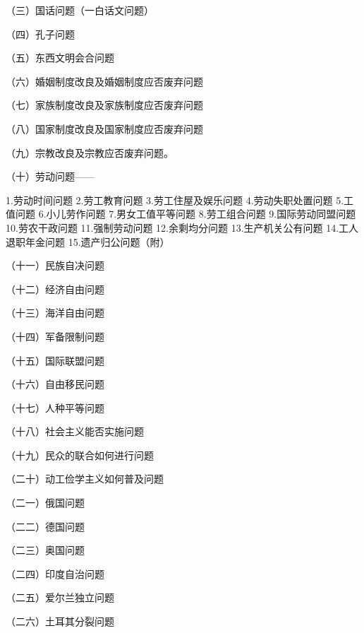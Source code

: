 （三）国话问题（一白话文问题）

（四）孔子问题

（五）东西文明会合问题

（六）婚姻制度改良及婚姻制度应否废弃问题

（七）家族制度改良及家族制度应否废弃问题

（八）国家制度改良及国家制度应否废弃问题

（九）宗教改良及宗教应否废弃问题。

（十）劳动问题——

1.劳动时间问题\hspace{1em}
2.劳工教育问题\hspace{1em}
3.劳工住屋及娱乐问题\hspace{1em}
4.劳动失职处置问题\hspace{1em}
5.工值问题\hspace{1em}
6.小儿劳作问题\hspace{1em}
7.男女工值平等问题\hspace{1em}
8.劳工组合问题\hspace{1em}
9.国际劳动同盟问题\hspace{1em}
10.劳农干政问题\hspace{1em}
11.强制劳动问题\hspace{1em}
12.余剩均分问题\hspace{1em}
13.生产机关公有问题\hspace{1em}
14.工人退职年金问题\hspace{1em}
15.遗产归公问题（附）

（十一）民族自决问题

（十二）经济自由问题

（十三）海洋自由问题

（十四）军备限制问题

（十五）国际联盟问题

（十六）自由移民问题

（十七）人种平等问题

（十八）社会主义能否实施问题

（十九）民众的联合如何进行问题

（二十）动工俭学主义如何普及问题

（二一）俄国问题

（二二）德国问题

（二三）奥国问题

（二四）印度自治问题

（二五）爱尔兰独立问题

（二六）土耳其分裂问题

